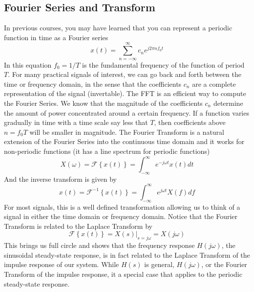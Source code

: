 \subsection{Fourier Series and Transform}
In previous courses, you may have learned that you can represent a periodic function in time as a Fourier series
    \begin{equation}
        x(t) = \sum_{n = -\infty}^{\infty} c_n e^{j 2 \pi n f_0 t} 
    \end{equation}
In this equation $f_0 = 1/T$ is the fundamental frequency of the function of period $T$.  For many practical signals of interest, we can go back and forth between the time or frequency domain, in the sense that the coefficients $c_n$ are a complete representation of the signal (invertable).  The FFT is an efficient way to compute the Fourier Series.   We know that the magnitude of the coefficients $c_n$ determine the amount of power concentrated around a certain frequency.  If a function varies gradually in time with a time scale say less that $T$, then coefficients above $n =  f_0 T $ will be smaller in magnitude.
The Fourier Transform is a natural extension of the Fourier Series into the continuous time domain and it works for non-periodic functions (it has a line spectrum for periodic functions)
    \begin{equation}
        X(\omega)  = \mathcal{F} \left\{ x(t) \right\} =  \int_{-\infty}^{\infty} e^{-j \omega t} x(t) dt
    \end{equation}
And the inverse transform is given by
    \begin{equation}
        x(t) =  \mathcal{F}^{-1} \left\{ x(t) \right\} = \int_{-\infty}^{\infty} e^{j \omega t} X(f) df
    \end{equation}
For most signals, this is a well defined transformation allowing us to think of a signal in either the time domain or frequency domain. Notice that the Fourier Transform is related to the Laplace Transform by
    \begin{equation}
        \mathcal{F} \left\{ x(t) \right\}  = \left. X(s) \right|_{s = j\omega}  = X(j\omega)
    \end{equation}
This brings us full circle and shows that the frequency response $H(j\omega)$, the sinusoidal steady-state response, is in fact related to the Laplace Transform of the impulse response of our system.  While $H(s)$ is general, $H(j\omega)$, or the Fourier Transform of the impulse response, it a special case that applies to the periodic steady-state response.  
